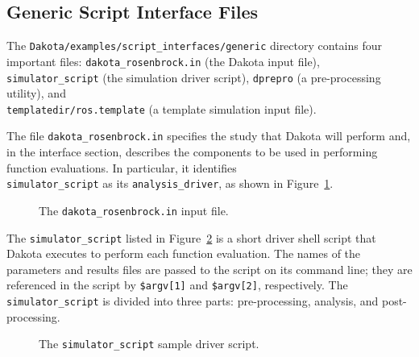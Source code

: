 \subsection{Generic Script Interface Files} 

The {\tt Dakota/examples/script\_interfaces/generic} directory contains four important files:
\texttt{dakota\_rosenbrock.in} (the Dakota input file),
\texttt{simulator\_script} (the simulation driver script),
\texttt{dprepro} (a pre-processing utility), and \\
\texttt{templatedir/ros.template} (a template simulation input file).

The file \texttt{dakota\_rosenbrock.in} specifies the study that
Dakota will perform and, in the interface section, describes the
components to be used in performing function evaluations. In
particular, it identifies \\ \texttt{simulator\_script} as its
\texttt{analysis\_driver}, as shown in Figure~\ref{advint:figure01}.
\begin{figure}
  \centering
  \begin{bigbox}
    \begin{small}
    \end{small}
  \end{bigbox}
  \caption{The \texttt{dakota\_rosenbrock.in} input file.}
  \label{advint:figure01}
\end{figure}

The \texttt{simulator\_script} listed in Figure~\ref{advint:figure02}
is a short driver shell script that Dakota executes to perform each
function evaluation. The names of the parameters and results files are
passed to the script on its command line; they are
referenced in the script by \texttt{\$argv[1]}
and \texttt{\$argv[2]}, respectively. The \texttt{simulator\_script}
is divided into three parts: pre-processing, analysis, and post-processing.

\begin{figure}
  \centering
  \begin{bigbox}
    \begin{small}
    \end{small}
  \end{bigbox}
  \caption{The \texttt{simulator\_script} sample driver script.}
  \label{advint:figure02}
\end{figure}

